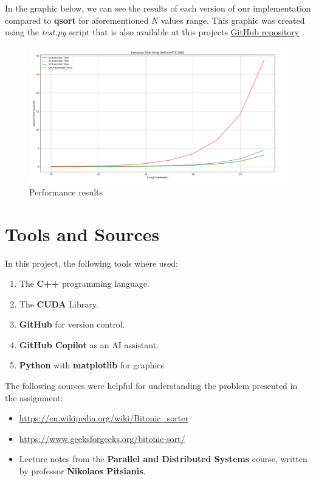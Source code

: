 \documentclass[12pt]{report}
\begin{document}
In the graphic below, we can see the results of each version of our implementation compared to \textbf{qsort} for aforementioned $N$ values range. This graphic was created using the \textit{test.py} script that is also available at this projects \textcolor{blue}{\href{https://github.com/stzanetis/BitonicSortCUDA}{GitHub repository}} .

\begin{figure}[H]
    \centering
    \includegraphics[width=1\linewidth]{results.png}
    \caption{Performance results}
    \label{fig:enter-label}
\end{figure}

\chapter{Tools and Sources}

In this project, the following tools where used:
\begin{enumerate}
    \item The \textbf{C++} programming language.
    \item The \textbf{CUDA} Library.
    \item \textbf{GitHub} for version control.
    \item \textbf{GitHub Copilot} as an AI assistant.
    \item \textbf{Python} with \textbf{matplotlib} for graphics
\end{enumerate}

The following sources were helpful for understanding the problem presented in the assignment:
\begin{itemize}
    \item \url{https://en.wikipedia.org/wiki/Bitonic_sorter}
    \item \url{https://www.geeksforgeeks.org/bitonic-sort/}
    \item Lecture notes from the \textbf{Parallel and Distributed Systems} course, written by professor \textbf{Nikolaos Pitsianis}.
\end{itemize}
\end{document}
